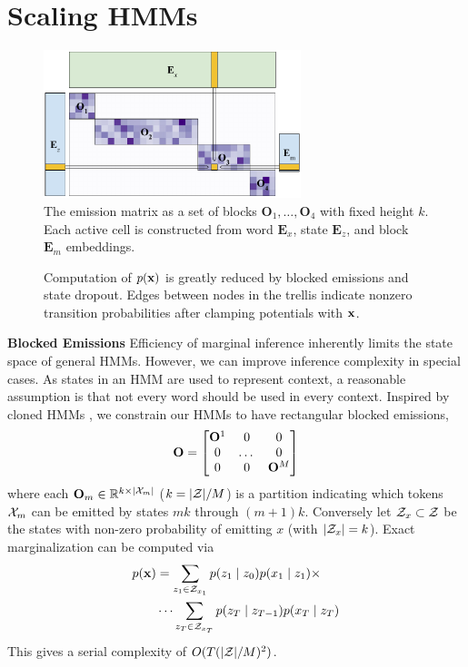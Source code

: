 \documentclass[11pt,a4paper]{article}
\begin{document}
\section{Scaling HMMs}
\label{sec:methods}

\begin{figure}[t]
\centering
\includegraphics[height=1.7in]{img/mat.pdf}
\caption{\label{fig:emit}
The emission matrix as a set of blocks $\mathbf{O}_1, \ldots, \mathbf{O}_4$
with fixed height $k$.
Each active cell is constructed from word $\mathbf{E}_x$, state $\mathbf{E}_z$,
and block $\mathbf{E}_m$ embeddings. 
}
\end{figure}

\begin{figure}[!t]
\begin{center}

\end{center}
\caption{
\label{fig:trellis}
Computation of $p(\mathbf{x})$ is greatly reduced by blocked emissions
and state dropout. Edges between nodes in the trellis indicate
nonzero transition probabilities after clamping potentials with $\mathbf{x}$.
}
\end{figure}

\noindent
\textbf{Blocked Emissions} Efficiency of marginal inference inherently limits 
the state space of general HMMs.
However, we can improve inference complexity in special cases.
As states in an HMM are used to represent context, a reasonable assumption
is that not every word should be used in every context.
Inspired by cloned HMMs \citep{dedieu2019learning},
we constrain our HMMs to have rectangular blocked emissions,
\[\mathbf{O} = \begin{bmatrix} \mathbf{O}^1 & 0 & 0 \\ 0 & $\dots$ & 0 \\ 0 & 0 & \mathbf{O}^M \\
\end{bmatrix}\]
where each $\mathbf{O}_m \in \mathbb{R}^{ k \times |\mathcal{X}_m|}$ ($k = |{\mathcal{Z}}|/M$)
is a partition indicating which tokens $\mathcal{X}_m$ can be emitted by states
$mk$ through $(m+1)k$.
Conversely let $\mathcal{Z}_x \subset {\cal Z}$ be the states with non-zero probability of emitting $x$
(with $|\mathcal{Z}_x| = k$).
Exact marginalization can be computed via 
\begin{equation}
\label{eqn:sparse_marginalization}
\begin{aligned}
p(\mathbf{x}) &= \sum_{z_1 \in \mathcal{Z}_{x_1}} p(z_1\mid z_0)p(x_1 \mid z_1) \times\\
    &\cdots
    \sum_{z_T \in \mathcal{Z}_{x_T}} p(z_T \mid z_{T-1})p(x_T \mid z_T)
\end{aligned}
\end{equation}
This gives a serial complexity of $O(T(|\mathcal{Z}|/M)^2)$.
\end{document}
